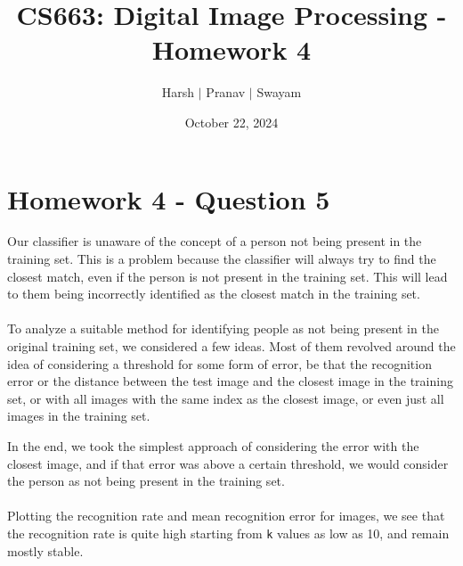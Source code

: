 \documentclass{article}
\title{CS663: Digital Image Processing - Homework 4}
\author{Harsh $\vert$ Pranav $\vert$ Swayam}
\date{October 22, 2024}
\begin{document}
\maketitle
\section{Homework 4 - Question 5}

Our classifier is unaware of the concept of a person not being present in the training set. This is a problem because the classifier will always try to find the closest match, even if the person is not present in the training set. This will lead to them being incorrectly identified as the closest match in the training set.
\\
\\
To analyze a suitable method for identifying people as not being present in the original training set, we considered a few ideas. Most of them revolved around the idea of considering a threshold for some form of error, be that the recognition error or the distance between the test image and the closest image in the training set, or with all images with the same index as the closest image, or even just all images in the training set. 

In the end, we took the simplest approach of considering the error with the closest image, and if that error was above a certain threshold, we would consider the person as not being present in the training set.
\\
\\
Plotting the recognition rate and mean recognition error for images, we see that the recognition rate is quite high starting from \texttt{k} values as low as 10, and remain mostly stable. 
\end{document}
